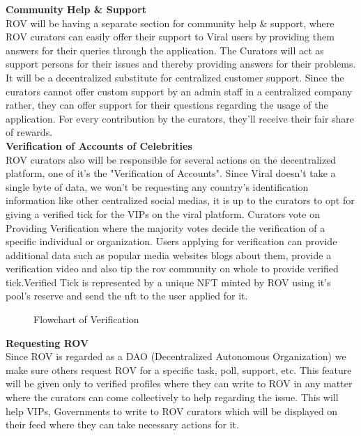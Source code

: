 \documentclass[10pt]{article}
\begin{document}
\textbf{Community Help \& Support}\\

ROV will be having a separate section for community help \& support, where ROV curators can easily offer their support to Viral users by providing them answers for their queries through the application. The Curators will act as support persons for their issues and thereby providing answers for their problems. It will be a decentralized substitute for centralized customer support. Since the curators cannot offer custom support by an admin staff in a centralized company rather, they can offer support for their questions regarding the usage of the application. For every contribution by the curators, they’ll receive their fair share of rewards.\\

\textbf{Verification of Accounts of Celebrities}\\

ROV curators also will be responsible for several actions on the decentralized platform, one of it's the "Verification of Accounts". Since Viral doesn’t take a single byte of data, we won’t be requesting any country’s identification information like other centralized social medias, it is up to the curators to opt for giving a verified tick for the VIPs on the viral platform. Curators vote on Providing Verification where the majority votes decide the verification of a specific individual or organization. Users applying for verification can provide additional data such as popular media websites blogs about them, provide a verification video and also tip the rov community on whole to provide verified tick.Verified Tick is represented by a unique NFT minted by ROV using it's pool's reserve and send the nft to the user applied for it.\\

\begin{figure}[H]
\begin{center}
\caption{Flowchart of Verification}
\end{center}
\end{figure}

\textbf{Requesting ROV}\\

Since ROV is regarded as a DAO (Decentralized Autonomous Organization) we make sure others request ROV for a specific task, poll, support, etc. This feature will be given only to verified profiles where they can write to ROV in any matter where the curators can come collectively to help regarding the issue. This will help VIPs, Governments to write to ROV curators which will be displayed on their feed where they can take necessary actions for it. \\
\end{document}
